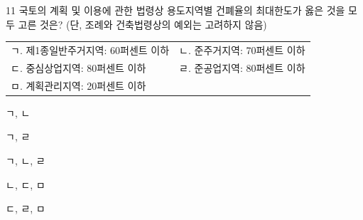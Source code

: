 \begin{question}{11}
국토의 계획 및 이용에 관한 법령상 용도지역별 건폐율의 최대한도가 옳은 것을 모두 고른 것은? (단, 조례와 건축법령상의 예외는 고려하지 않음)
\begin{framedtext}
\begin{tabular}{@{}ll@{}}
ㄱ. 제1종일반주거지역: 60퍼센트 이하 & ㄴ. 준주거지역: 70퍼센트 이하 \\
ㄷ. 중심상업지역: 80퍼센트 이하 & ㄹ. 준공업지역: 80퍼센트 이하 \\
ㅁ. 계획관리지역: 20퍼센트 이하 & \\
\end{tabular}
\end{framedtext}
\begin{choices}
  \item ㄱ, ㄴ
  \item ㄱ, ㄹ
  \item ㄱ, ㄴ, ㄹ
  \item ㄴ, ㄷ, ㅁ
  \item ㄷ, ㄹ, ㅁ
\end{choices}
\end{question}

